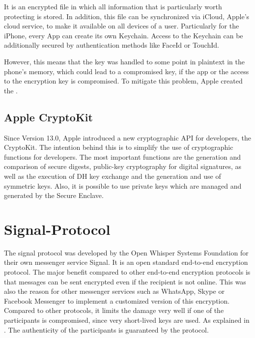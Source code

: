 \documentclass[12pt,oneside,a4paper,parskip]{scrbook}
\begin{document}
It is an encrypted file in which all information that is particularly worth protecting is stored. In addition, this file can be synchronized via iCloud, Apple's cloud service, to make it available on all devices of a user. Particularly for the iPhone, every App can create its own Keychain. Access to the Keychain can be additionally secured by authentication methods like FaceId or TouchId.

However, this means that the key was handled to some point in plaintext in the phone's memory, which could lead to a compromised key, if the app or the access to the encryption key is compromised. To mitigate this problem, Apple created the . 
\parencite{apple_keychain_2020}

\subsection{Apple CryptoKit}

Since Version 13.0, Apple introduced a new cryptographic API for developers, the CryptoKit. The intention behind this is to simplify the use of cryptographic functions for developers. The most important functions are the generation and comparison of secure digests, public-key cryptography for digital signatures, as well as the execution of DH key exchange and the generation and use of symmetric keys. Also, it is possible to use private keys which are managed and generated by the Secure Enclave.

\section{Signal-Protocol}

The signal protocol was developed by the Open Whisper Systems Foundation for their own messenger service Signal. It is an open standard end-to-end encryption protocol. The major benefit compared to other end-to-end encryption protocols is that messages can be sent encrypted even if the recipient is not online. This was also the reason for other messenger services such as WhatsApp, Skype or Facebook Messenger to implement a customized version of this encryption. Compared to other protocols, it limits the damage very well if one of the participants is compromised, since very short-lived keys are used. As explained in . The authenticity of the participants is guaranteed by the  protocol. 
\parencite{protocol_introducing_2018}
\end{document}
